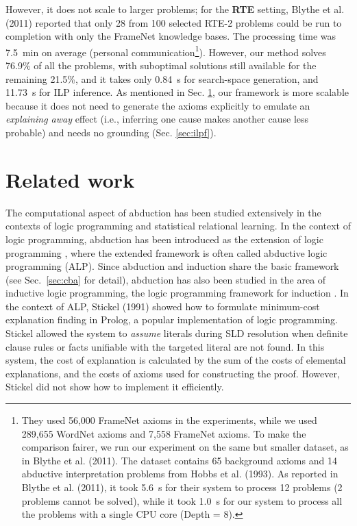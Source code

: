 \documentclass[english]{jnlp_1.4}
\begin{document}
However, it does not scale to larger problems; for the
\textbf{RTE} setting, Blythe et al. (2011)\nocite{Blythe11} reported
that only 28 from 100 selected RTE-2 problems could be run to
completion with only the FrameNet knowledge bases. The processing time
was 7.5~min on average (personal communication\footnote{They used 56,000 FrameNet
  axioms in the experiments, while we used 289,655 WordNet axioms and
  7,558 FrameNet axioms. To make the comparison fairer, we run our
  experiment on the same but smaller dataset, as in Blythe et
  al. (2011).\nocite{Blythe11}
  The dataset contains 65 background axioms and 14 abductive interpretation problems
  from Hobbs et al. (1993).\nocite{Hobbs93} As reported in
  Blythe et al. (2011)\nocite{Blythe11}, it took 5.6~s for their system to
  process 12 problems (2 problems cannot be solved), while it took 1.0~s for our system to process all the problems
  with a single CPU core (Depth = 8).}).
  However, our method solves 76.9\% of all the problems, with suboptimal
solutions still available for the remaining 21.5\%, and it takes
only 0.84~s for search-space generation, and 11.73~s for
ILP inference. As mentioned in Sec. \ref{sec:related_work}, our
framework is more scalable because it does not need to
generate the axioms explicitly to emulate an \emph{explaining away}
effect (i.e., inferring one cause makes another cause less probable)
and needs no grounding (Sec. \ref{sec:ilpf}).


\section{Related work}
\label{sec:related_work}

The computational aspect of abduction has been studied extensively in
the contexts of logic programming and statistical relational learning.
In the context of logic programming, abduction has been introduced as
the extension of logic programming \cite{Stickel91,Kakas92},
where the extended framework is often called abductive logic
programming (ALP). Since abduction and induction share the basic
framework (see Sec.~\ref{sec:cba} for detail), abduction has also been
studied in the area of inductive logic programming, the logic
programming framework for induction
\cite{Inoue04,Tamaddoni-Nezhad06}.
In the context of ALP, Stickel (1991) \nocite{Stickel91} showed how to
formulate minimum-cost explanation finding in Prolog, a popular
implementation of logic programming. Stickel allowed the system to
\emph{assume} literals during SLD resolution when definite clause
rules or facts unifiable with the targeted literal are not found. In
this system, the cost of explanation is calculated by the sum of the
costs of elemental explanations, and the costs of axioms used for
constructing the proof. However, Stickel did not show how to
implement it efficiently.
\end{document}
